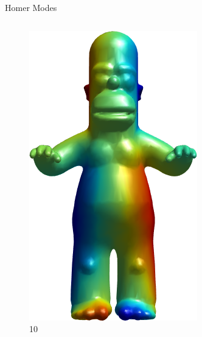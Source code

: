 \documentclass{beamer}
\begin{document}
\begin{frame}{Homer Modes}
\begin{columns}
\begin{column}[T]{3cm}
\begin{figure}[t]
    \includegraphics[width=\textwidth]{Harmonics/HomerModes/10.png}
    \caption*{\huge 10}
\end{figure}
\end{column}
\begin{column}[T]{3cm}
\begin{figure}[t]


\end{figure}
\end{column}
\end{columns}
\end{frame}
\end{document}
